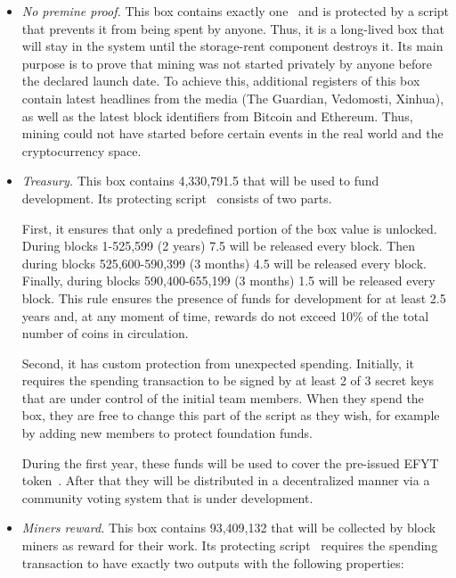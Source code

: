 \begin{itemize}
    \item{\em No premine proof.} This box contains exactly one~\Erg{} and is protected by a script that prevents it from being spent by anyone.
    Thus, it is a long-lived box that will stay in the system until the storage-rent component
    destroys it.
    Its main purpose is to prove that \Ergo{} mining was not started privately by anyone before
    the declared launch date.
    To achieve this, additional registers of this box contain latest headlines from the media (The Guardian, Vedomosti, Xinhua), as well as the latest block identifiers from Bitcoin and Ethereum.
    Thus, \Ergo{} mining could not have started before certain events in the real world and the cryptocurrency space.

    \item{\em Treasury.} This box contains 4,330,791.5 \Erg{} that will be used to fund \Ergo{}
    development.
    Its protecting script~\cite{link to corresponding ergo tree} consists of two parts.

    First, it ensures that only a predefined portion of the box value is unlocked.
    During blocks 1-525,599 (2 years) 7.5 \Erg{} will be released every block. Then during blocks 525,600-590,399 (3 months) 4.5 \Erg{} will be released every block. Finally, 
    during blocks 590,400-655,199 (3 months) 1.5 \Erg{} will be released every block.
    This rule ensures the presence of funds for \Ergo{} development for at least 2.5 years and, at any moment of time,
    rewards do not exceed 10\% of the total number of coins in circulation.

    Second, it has custom protection from unexpected spending.
    Initially, it requires the spending transaction to be signed by at least 2 of 3 secret keys that are under control of the initial team members. When they spend the box, they are free to
    change this part of the script as they wish, for example by adding new members to protect foundation
    funds.

    During the first year, these funds will be used to cover the pre-issued EFYT token~\cite{our website with swap }. After that they will be distributed in a decentralized manner via a community voting system that is under development.


    \item{\em Miners reward.} This box contains 93,409,132 \Erg{} that will be collected by block miners
    as reward for their work.
    Its protecting script~\cite{link to corresponding ergo tree} requires the spending transaction to have exactly two outputs with the following properties:


\end{itemize}
